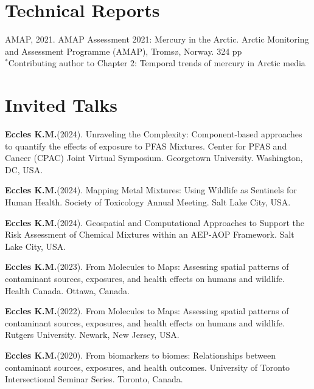 \documentclass[margin,line]{res}
\begin{document}
\begin{resume}
\begin{etaremune}[start=26]
\end{etaremune}

\vspace*{.1in}
\section{\sc Technical Reports}
AMAP, 2021. AMAP Assessment 2021: Mercury in the Arctic. Arctic Monitoring and Assessment Programme (AMAP), Tromsø, Norway. 324 pp\\
$^{*}$Contributing author to Chapter 2: Temporal trends of mercury in Arctic media\\
\vspace*{.1in}
\section{\sc Invited Talks}

\begin{etaremune}[start=9]

\item \textbf{Eccles K.M.}(2024). Unraveling the Complexity: Component-based approaches to quantify the effects of exposure to PFAS Mixtures. Center for PFAS and Cancer (CPAC) Joint Virtual Symposium. Georgetown University. Washington, DC, USA.

\item \textbf{Eccles K.M.}(2024). Mapping Metal Mixtures: Using Wildlife as Sentinels for Human Health. Society of Toxicology Annual Meeting. Salt Lake City, USA.

\item \textbf{Eccles K.M.}(2024). Geospatial and Computational Approaches to Support the Risk Assessment of Chemical Mixtures within an AEP-AOP Framework. Salt Lake City, USA.

\item \textbf{Eccles K.M.}(2023). From Molecules to Maps: Assessing spatial patterns of contaminant sources, exposures, and health effects on humans and wildlife. Health Canada. Ottawa, Canada.

\item \textbf{Eccles K.M.}(2022). From Molecules to Maps: Assessing spatial patterns of contaminant sources, exposures, and health effects on humans and wildlife. Rutgers University. Newark, New Jersey, USA.

\item \textbf{Eccles K.M.}(2020). From biomarkers to biomes: Relationships between contaminant sources, exposures, and health outcomes. University of Toronto Intersectional Seminar Series. Toronto, Canada.


\end{etaremune}
\end{resume}
\end{document}

